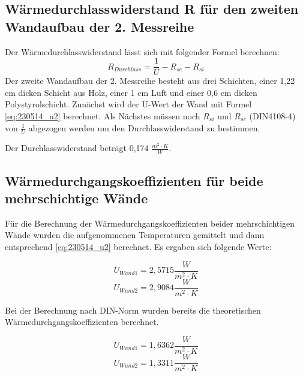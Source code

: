 \subsection{Wärmedurchlasswiderstand R für den zweiten Wandaufbau der 2. Messreihe}
Der Wärmedurchlasswiderstand lässt sich mit folgender Formel berechnen:
%
\begin{equation}
R_{Durchlass}=\frac{1} {U} - R_{se} - R_{si}
  \label{eq:230522_Wärmewiderstand}
\end{equation}
%
Der zweite Wandaufbau der 2. Messreihe besteht aus drei Schichten, einer 1,22 cm dicken Schicht aus Holz, einer 1 cm Luft und einer 0,6 cm dicken Polystyrolschicht. 
Zunächst wird der U-Wert der Wand mit Formel \ref{eq:230514_u2}  berechnet. Als Nächstes müssen noch $R_{si}$ und $R_{se}$ (DIN4108-4) von  $\frac{1}{U}$ abgezogen werden um den Durchlasswiderstand zu bestimmen. 

Der Durchlasswiderstand beträgt 0,174 $\frac{ m^2 \cdot K }{W}$. 

\newpage
\subsection{Wärmedurchgangskoeffizienten für beide mehrschichtige Wände}
Für die Berechnung der Wärmedurchgangskoeffizienten beider mehrschichtigen Wände wurden die aufgenommenen Temperaturen gemittelt und dann entsprechend \autoref{eq:230514_u2} berechnet.
Es ergaben sich folgende Werte:

\begin{equation*}
  U_{Wand 1} = 2,5715 \frac{W}{m^2 \cdot K}
\end{equation*}
\begin{equation*}
  U_{Wand 2} = 2,9084 \frac{W}{m^2 \cdot K}
\end{equation*}

Bei der Berechnung nach DIN-Norm wurden bereits die theoretischen Wärmedurchgangskoeffizienten
berechnet.

\begin{equation*}
  U_{Wand 1}=1,6362 \frac{W}{m^2 \cdot K}
\end{equation*}
\begin{equation*}
  U_{Wand 2}=1,3311 \frac{W}{m^2 \cdot K}
\end{equation*}

